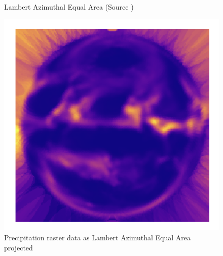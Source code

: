 \begin{figure}[H]
\begin{minipage}{0.30\textwidth}
        \caption{Lambert Azimuthal Equal Area (Source \cite{PROJ_SITE})}
        \label{fig:laea_proj}
    \end{minipage}\hfill
    \begin{minipage}{0.30\textwidth}
        \centering
        \includegraphics[width=0.9\linewidth]{figures/chapter-8/prect_laea.png}
        \caption{Precipitation raster data as Lambert Azimuthal Equal Area projected}
        \label{fig:laea_prect_raster}
    \end{minipage}\hfill
\end{figure}


